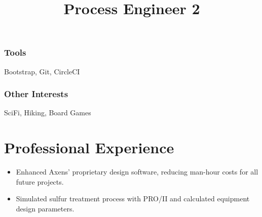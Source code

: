 \documentclass[12pt]{res} %
\begin{document}
\begin{resume}
\begin{multicols}{3}
            \subsubsection{Tools}
            \vspace{-22pt}
            Bootstrap, Git, CircleCI
            \vspace{-28pt}

            \subsubsection{Other Interests}
            \vspace{-22pt}
            SciFi, Hiking, Board Games

            \vspace{-12pt}

          \end{multicols}
        \vspace{-24pt}

      \section{Professional Experience}
        \title{\textbf{Process Engineer 2}}
        \begin{position}
          \vspace{-14pt}
          \begin{itemize}[leftmargin=-0.4cm]
          \itemsep0em
          \item Enhanced Axens' proprietary design software, reducing man-hour costs for all future projects.
          \item Simulated sulfur treatment process with PRO/II and calculated equipment design parameters.
          \end{itemize}
        \end{position}
        \vspace{-10pt}


\end{resume}
\end{document}
